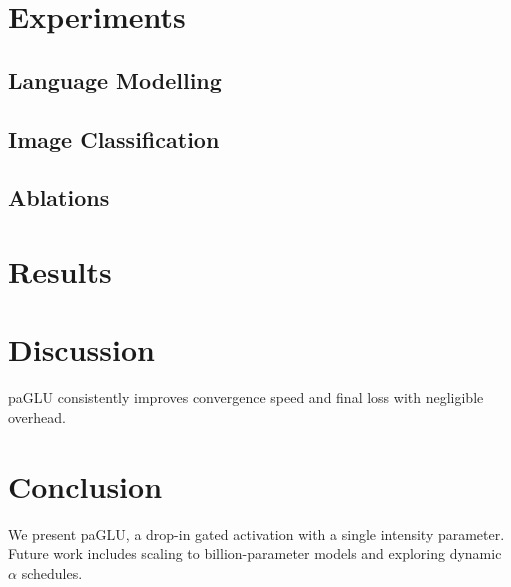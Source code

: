 \documentclass[11pt]{article}
\begin{document}
\section{Experiments}
\subsection{Language Modelling}

\subsection{Image Classification}

\subsection{Ablations}


\section{Results}


\section{Discussion}
paGLU consistently improves convergence speed and final loss with negligible overhead.

\section{Conclusion}
We present paGLU, a drop-in gated activation with a single intensity parameter.  Future work includes scaling to billion-parameter models and exploring dynamic $\alpha$ schedules.



\end{document}

